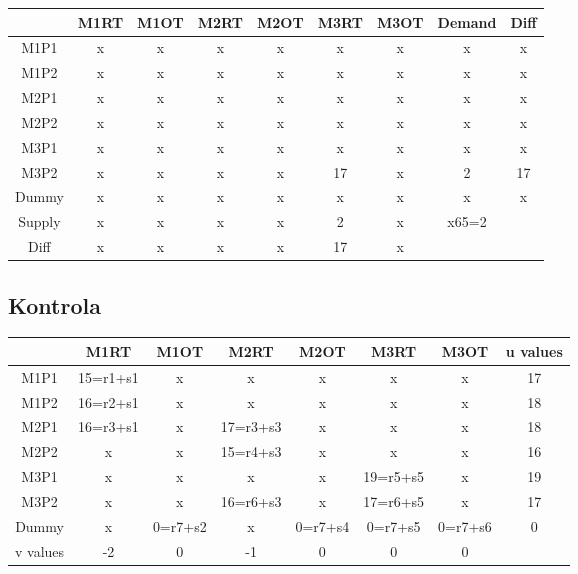\documentclass{article}%
\begin{document}
\begin{tabular}{c|cccc|c|ccc}
    & M1RT & M1OT & M2RT & M2OT & M3RT & M3OT & Demand               & Diff                 \\
    \midrule
    M1P1   & x    & x    & x    & x    & x    & x    & x                    & x                    \\
    M1P2   & x    & x    & x    & x    & x    & x    & x                    & x                    \\
    M2P1   & x    & x    & x    & x    & x    & x    & x                    & x                    \\
    M2P2   & x    & x    & x    & x    & x    & x    & x                    & x                    \\
    M3P1   & x    & x    & x    & x    & x    & x    & x                    & x                    \\
    \cmidrule{2-9}
    M3P2   & x    & x    & x    & x    & 17   & x    & 2                    & 17                   \\
    \cmidrule{2-9}
    Dummy  & x    & x    & x    & x    & x    & x    & x                    & x                    \\
    Supply & x    & x    & x    & x    & 2    & x    & x65=2                &                      \\
    Diff   & x    & x    & x    & x    & 17   & x    &                      &                      \\
\end{tabular}
\newline
\newline

\newpage
\subsection{Kontrola}
\begin{tabular}{c|ccccccc}
    & M1RT     & M1OT    & M2RT     & M2OT    & M3RT     & M3OT    & u values \\
    \midrule
    M1P1     & 15=r1+s1 & x       & x        & x       & x        & x       & 17       \\
    M1P2     & 16=r2+s1 & x       & x        & x       & x        & x       & 18       \\
    M2P1     & 16=r3+s1 & x       & 17=r3+s3 & x       & x        & x       & 18       \\
    M2P2     & x        & x       & 15=r4+s3 & x       & x        & x       & 16       \\
    M3P1     & x        & x       & x        & x       & 19=r5+s5 & x       & 19       \\
    M3P2     & x        & x       & 16=r6+s3 & x       & 17=r6+s5 & x       & 17       \\
    Dummy    & x        & 0=r7+s2 & x        & 0=r7+s4 & 0=r7+s5  & 0=r7+s6 & 0        \\
    v values & -2       & 0       & -1       & 0       & 0        & 0       &         
\end{tabular}
\newline
\newline
\end{document}
